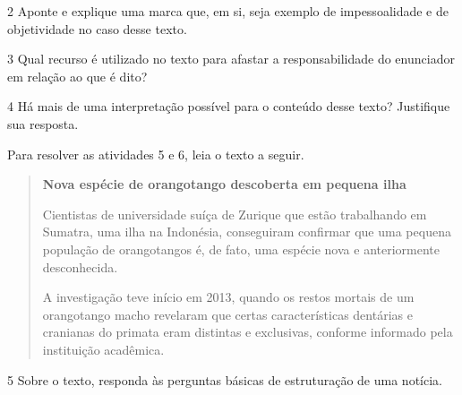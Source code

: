 
\num{2} Aponte e explique uma marca que, em si, seja exemplo de impessoalidade e de objetividade no caso desse texto.


\num{3} Qual recurso é utilizado no texto para afastar a responsabilidade do enunciador em relação ao que é dito?


\num{4} Há mais de uma interpretação possível para o conteúdo desse
texto? Justifique sua resposta.


Para resolver as atividades 5 e 6, leia o texto a seguir.

\begin{quote}
\centering\textbf{Nova espécie de orangotango descoberta em pequena ilha}


Cientistas de universidade suíça de Zurique que estão trabalhando em
Sumatra, uma ilha na Indonésia, conseguiram confirmar que uma pequena
população de orangotangos é, de fato, uma espécie nova e anteriormente desconhecida.

A investigação teve início em 2013, quando os restos mortais de um
orangotango macho revelaram que certas características dentárias e
cranianas do primata eram distintas e exclusivas, conforme informado
pela instituição acadêmica.

\end{quote}

\num{5} Sobre o texto, responda às perguntas básicas de estruturação de uma notícia.


